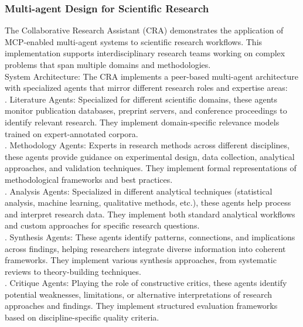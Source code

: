 \subsubsection{Multi-agent Design for Scientific Research}
The Collaborative Research Assistant (CRA) demonstrates the application of MCP-enabled multi-agent systems to scientific research workflows. This implementation supports interdisciplinary research teams working on complex problems that span multiple domains and methodologies.\\ \newline
System Architecture: The CRA implements a peer-based multi-agent architecture with specialized agents that mirror different research roles and expertise areas:\\ . Literature Agents: Specialized for different scientific domains, these agents monitor publication databases, preprint servers, and conference proceedings to identify relevant research. They implement domain-specific relevance models trained on expert-annotated corpora.\\ . Methodology Agents: Experts in research methods across different disciplines, these agents provide guidance on experimental design, data collection, analytical approaches, and validation techniques. They implement formal representations of methodological frameworks and best practices.\\ . Analysis Agents: Specialized in different analytical techniques (statistical analysis, machine learning, qualitative methods, etc.), these agents help process and interpret research data. They implement both standard analytical workflows and custom approaches for specific research questions.\\ . Synthesis Agents: These agents identify patterns, connections, and implications across findings, helping researchers integrate diverse information into coherent frameworks. They implement various synthesis approaches, from systematic reviews to theory-building techniques.\\ . Critique Agents: Playing the role of constructive critics, these agents identify potential weaknesses, limitations, or alternative interpretations of research approaches and findings. They implement structured evaluation frameworks based on discipline-specific quality criteria.\\ \newline

